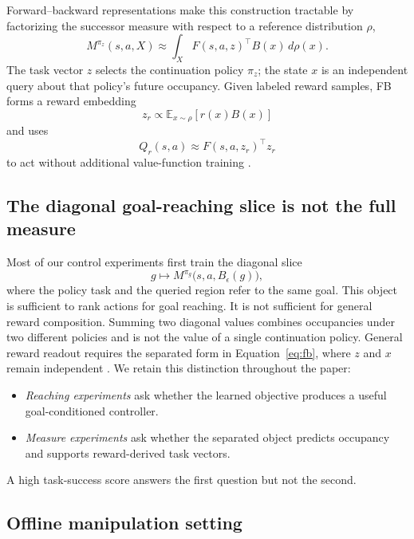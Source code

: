 \documentclass{article}
\newcommand{\E}{\mathbb{E}}
\begin{document}
Forward--backward representations make this construction tractable by
factorizing the successor measure with respect to a reference distribution
$\rho$,
\begin{equation}
\label{eq:fb}
M^{\pi_z}(s,a,X)
\approx
\int_X F(s,a,z)^{\top}B(x)\,d\rho(x).
\end{equation}
The task vector $z$ selects the continuation policy $\pi_z$; the state $x$ is an
independent query about that policy's future occupancy. Given labeled reward
samples, FB forms a reward embedding
\begin{equation}
\label{eq:reward-moment}
z_r \propto \E_{x\sim\rho}[r(x)B(x)]
\end{equation}
and uses
\begin{equation}
Q_r(s,a)\approx F(s,a,z_r)^{\top}z_r
\end{equation}
to act without additional value-function training
\citep{touati2021learning,touati2023does}.

\subsection{The diagonal goal-reaching slice is not the full measure}

Most of our control experiments first train the diagonal slice
\begin{equation}
\label{eq:diag}
g\longmapsto M^{\pi_g}\!\big(s,a,B_\epsilon(g)\big),
\end{equation}
where the policy task and the queried region refer to the same goal. This object
is sufficient to rank actions for goal reaching. It is not sufficient for general
reward composition. Summing two diagonal values combines occupancies under two
different policies and is not the value of a single continuation policy. General
reward readout requires the separated form in Equation~\ref{eq:fb}, where $z$ and
$x$ remain independent \citep{blier2021learning}. We retain this distinction
throughout the paper:
\begin{itemize}
    \item \emph{Reaching experiments} ask whether the learned objective produces a
    useful goal-conditioned controller.
    \item \emph{Measure experiments} ask whether the separated object predicts
    occupancy and supports reward-derived task vectors.
\end{itemize}
A high task-success score answers the first question but not the second.

\subsection{Offline manipulation setting}
\end{document}

